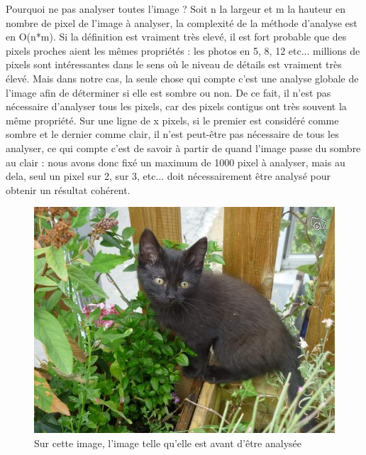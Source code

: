				Pourquoi ne pas analyser toutes l'image ?
				Soit n la largeur et m la hauteur en nombre de pixel de l'image à analyser, la complexité de la méthode d'analyse est en O(n*m). Si la définition est vraiment très elevé, il est fort probable que des pixels proches aient les mêmes propriétés : les photos en 5, 8, 12 etc... millions de pixels sont intéressantes dans le sens où le niveau de détails est vraiment très élevé. Mais dans notre cas, la seule chose qui compte c'est une analyse globale de l'image afin de déterminer si elle est sombre ou non. De ce fait, il n'est pas nécessaire d'analyser tous les pixels, car des pixels contigus ont très souvent la même propriété. Sur une ligne de x pixels, si le premier est considéré comme sombre et le dernier comme clair, il n'est peut-être pas nécessaire de tous les analyser, ce qui compte c'est de savoir à partir de quand l'image passe du sombre au clair : nous avons donc fixé un maximum de 1000 pixel à analyser, mais au dela, seul un pixel sur 2, sur 3, etc... doit nécessairement être analysé pour obtenir un résultat cohérent.
				
				
				\begin{figure}[!htbp]
				  \centering
				  \includegraphics[scale=0.50]{img/gala_v1}
				  \caption{Sur cette image, l'image telle qu'elle est avant d'être analysée}
				  \label{fig:chatonAvantAnalyse}
				\end{figure}
				
